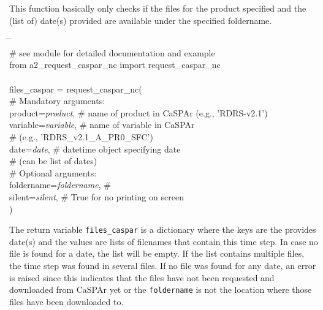 \documentclass[10pt,a4paper,titlepage,parskip]{scrartcl}
\newenvironment{ttfont}{\fontfamily{\ttdefault}\selectfont}{\par}
\newcommand{\GRAU}[1]{\textcolor{ufzgray2}{#1}}
\begin{document}
This function basically only checks if the files for the product specified and the (list of)
date(s) provided are available under the specified foldername.
\begin{framed}
	\vspace*{-1.2cm}
	\begin{ttfont}
		\begin{tabbing}
			\hspace{1.0cm} \= \hspace{4.1cm} \= \kill \\[4pt]
			\GRAU{\# see module for detailed documentation and example}\\
			from a2\_request\_caspar\_nc import request\_caspar\_nc\\
			\\
			files\_caspar = request\_caspar\_nc( \\
				\> \GRAU{\# Mandatory arguments:}\\
				\> product=\textit{product}, \> \GRAU{\# name of product in CaSPAr (e.g., 'RDRS-v2.1')} \\
				\> variable=\textit{variable}, \> \GRAU{\# name of variable in CaSPAr}\\
				\> \> \GRAU{\#  (e.g., 'RDRS\_v2.1\_A\_PR0\_SFC')}\\
				\> date=\textit{date}, \> \GRAU{\# datetime object specifying date}\\
				\> \> \GRAU{\#  (can be list of dates)}\\
				\> \GRAU{\# Optional arguments:}\\
				\> foldername=\textit{foldername}, \> \GRAU{\# } \\
				\> silent=\textit{silent}, \> \GRAU{\# True for no printing on screen} \\
			\> ) \> 
		\end{tabbing}
	\end{ttfont}
	\vspace*{-0.3cm}
\end{framed}
\vspace*{-0.3cm}
The return variable \texttt{files\_caspar} is a dictionary where the keys are the provides date(s) and the values are lists of filenames that contain this time step. In case no file is found for a date, the list will be empty. If the list contains multiple files, the time step was found in several files. If no file was found for any date, an error is raised since this indicates that the files have not been requested and downloaded from CaSPAr yet or the \texttt{foldername} is not the location where those files have been downloaded to. 
\end{document}
